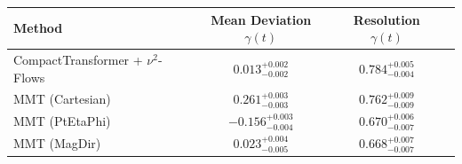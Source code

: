     \begin{tabular}{lccc}
        \toprule
        Method & Mean Deviation $\gamma(t)$ & Resolution $\gamma(t)$ \\
        \midrule
        CompactTransformer + $\nu^2$-Flows & $0.013^{+0.002}_{-0.002}$ & $0.784^{+0.005}_{-0.004}$ \\
        MMT (Cartesian) & $0.261^{+0.003}_{-0.003}$ & $0.762^{+0.009}_{-0.009}$ \\
        MMT (PtEtaPhi) & $-0.156^{+0.003}_{-0.004}$ & $0.670^{+0.006}_{-0.007}$ \\
        MMT (MagDir) & $0.023^{+0.004}_{-0.005}$ & $0.668^{+0.007}_{-0.007}$ \\
        \bottomrule
    \end{tabular}